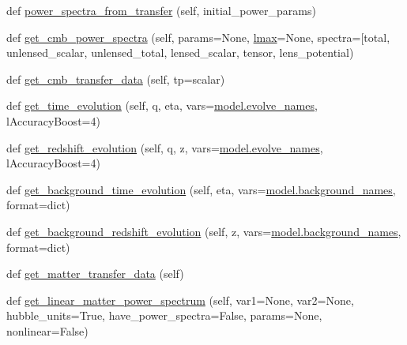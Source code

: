 \begin{DoxyCompactItemize}
\item 
def \mbox{\hyperlink{classcamb_1_1camb_1_1CAMBdata_a9fceb84d376ce937446c78b7e8b9034a}{power\+\_\+spectra\+\_\+from\+\_\+transfer}} (self, initial\+\_\+power\+\_\+params)
\item 
def \mbox{\hyperlink{classcamb_1_1camb_1_1CAMBdata_a59d6f78493417bf69c40475e4c9a697f}{get\+\_\+cmb\+\_\+power\+\_\+spectra}} (self, params=None, \mbox{\hyperlink{plotTT_8m_aa9755a1150619f3bbad65080cf613ef8}{lmax}}=None, spectra=\mbox{[}\textquotesingle{}total\textquotesingle{}, unlensed\+\_\+scalar, unlensed\+\_\+total, lensed\+\_\+scalar, tensor, lens\+\_\+potential)
\item 
def \mbox{\hyperlink{classcamb_1_1camb_1_1CAMBdata_a5065605556b12be1125fa51140eb745f}{get\+\_\+cmb\+\_\+transfer\+\_\+data}} (self, tp=\textquotesingle{}scalar\textquotesingle{})
\item 
def \mbox{\hyperlink{classcamb_1_1camb_1_1CAMBdata_ac826165c4abf9f9d2afd26a082345023}{get\+\_\+time\+\_\+evolution}} (self, q, eta, vars=\mbox{\hyperlink{namespacecamb_1_1model_a54f64726c80596131e388af10aa41cb6}{model.\+evolve\+\_\+names}}, l\+Accuracy\+Boost=4)
\item 
def \mbox{\hyperlink{classcamb_1_1camb_1_1CAMBdata_a429985d3103382ee2faaa702bd125ff8}{get\+\_\+redshift\+\_\+evolution}} (self, q, z, vars=\mbox{\hyperlink{namespacecamb_1_1model_a54f64726c80596131e388af10aa41cb6}{model.\+evolve\+\_\+names}}, l\+Accuracy\+Boost=4)
\item 
def \mbox{\hyperlink{classcamb_1_1camb_1_1CAMBdata_a07e53d4b201c37fd204545577717b42b}{get\+\_\+background\+\_\+time\+\_\+evolution}} (self, eta, vars=\mbox{\hyperlink{namespacecamb_1_1model_ad21210b2a1480586c2da0e821e0f5dfb}{model.\+background\+\_\+names}}, format=\textquotesingle{}dict\textquotesingle{})
\item 
def \mbox{\hyperlink{classcamb_1_1camb_1_1CAMBdata_a29f3b8fde294834832ea19680e254d31}{get\+\_\+background\+\_\+redshift\+\_\+evolution}} (self, z, vars=\mbox{\hyperlink{namespacecamb_1_1model_ad21210b2a1480586c2da0e821e0f5dfb}{model.\+background\+\_\+names}}, format=\textquotesingle{}dict\textquotesingle{})
\item 
def \mbox{\hyperlink{classcamb_1_1camb_1_1CAMBdata_a81d01bc1ae174319453f1e3565f2dfda}{get\+\_\+matter\+\_\+transfer\+\_\+data}} (self)
\item 
def \mbox{\hyperlink{classcamb_1_1camb_1_1CAMBdata_a6bd8c498d329e23ebefc55648ad59ab2}{get\+\_\+linear\+\_\+matter\+\_\+power\+\_\+spectrum}} (self, var1=None, var2=None, hubble\+\_\+units=True, have\+\_\+power\+\_\+spectra=False, params=None, nonlinear=False)

\end{DoxyCompactItemize}
